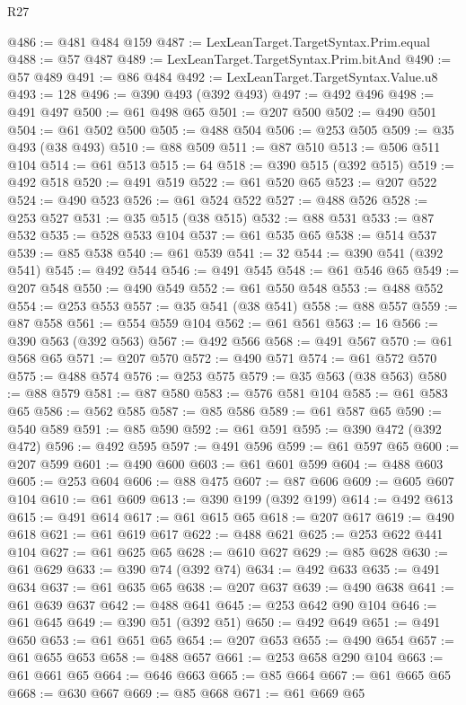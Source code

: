 \begin{lexlean}{R27}
\begin{coremodule}
@486 := @481 @484 @159
@487 := LexLeanTarget.TargetSyntax.Prim.equal
@488 := @57 @487
@489 := LexLeanTarget.TargetSyntax.Prim.bitAnd
@490 := @57 @489
@491 := @86 @484
@492 := LexLeanTarget.TargetSyntax.Value.u8
@493 := 128
@496 := @390 @493 (@392 @493)
@497 := @492 @496
@498 := @491 @497
@500 := @61 @498 @65
@501 := @207 @500
@502 := @490 @501
@504 := @61 @502 @500
@505 := @488 @504
@506 := @253 @505
@509 := @35 @493 (@38 @493)
@510 := @88 @509
@511 := @87 @510
@513 := @506 @511 @104
@514 := @61 @513
@515 := 64
@518 := @390 @515 (@392 @515)
@519 := @492 @518
@520 := @491 @519
@522 := @61 @520 @65
@523 := @207 @522
@524 := @490 @523
@526 := @61 @524 @522
@527 := @488 @526
@528 := @253 @527
@531 := @35 @515 (@38 @515)
@532 := @88 @531
@533 := @87 @532
@535 := @528 @533 @104
@537 := @61 @535 @65
@538 := @514 @537
@539 := @85 @538
@540 := @61 @539
@541 := 32
@544 := @390 @541 (@392 @541)
@545 := @492 @544
@546 := @491 @545
@548 := @61 @546 @65
@549 := @207 @548
@550 := @490 @549
@552 := @61 @550 @548
@553 := @488 @552
@554 := @253 @553
@557 := @35 @541 (@38 @541)
@558 := @88 @557
@559 := @87 @558
@561 := @554 @559 @104
@562 := @61 @561
@563 := 16
@566 := @390 @563 (@392 @563)
@567 := @492 @566
@568 := @491 @567
@570 := @61 @568 @65
@571 := @207 @570
@572 := @490 @571
@574 := @61 @572 @570
@575 := @488 @574
@576 := @253 @575
@579 := @35 @563 (@38 @563)
@580 := @88 @579
@581 := @87 @580
@583 := @576 @581 @104
@585 := @61 @583 @65
@586 := @562 @585
@587 := @85 @586
@589 := @61 @587 @65
@590 := @540 @589
@591 := @85 @590
@592 := @61 @591
@595 := @390 @472 (@392 @472)
@596 := @492 @595
@597 := @491 @596
@599 := @61 @597 @65
@600 := @207 @599
@601 := @490 @600
@603 := @61 @601 @599
@604 := @488 @603
@605 := @253 @604
@606 := @88 @475
@607 := @87 @606
@609 := @605 @607 @104
@610 := @61 @609
@613 := @390 @199 (@392 @199)
@614 := @492 @613
@615 := @491 @614
@617 := @61 @615 @65
@618 := @207 @617
@619 := @490 @618
@621 := @61 @619 @617
@622 := @488 @621
@625 := @253 @622 @441 @104
@627 := @61 @625 @65
@628 := @610 @627
@629 := @85 @628
@630 := @61 @629
@633 := @390 @74 (@392 @74)
@634 := @492 @633
@635 := @491 @634
@637 := @61 @635 @65
@638 := @207 @637
@639 := @490 @638
@641 := @61 @639 @637
@642 := @488 @641
@645 := @253 @642 @90 @104
@646 := @61 @645
@649 := @390 @51 (@392 @51)
@650 := @492 @649
@651 := @491 @650
@653 := @61 @651 @65
@654 := @207 @653
@655 := @490 @654
@657 := @61 @655 @653
@658 := @488 @657
@661 := @253 @658 @290 @104
@663 := @61 @661 @65
@664 := @646 @663
@665 := @85 @664
@667 := @61 @665 @65
@668 := @630 @667
@669 := @85 @668
@671 := @61 @669 @65

\end{coremodule}
\end{lexlean}
